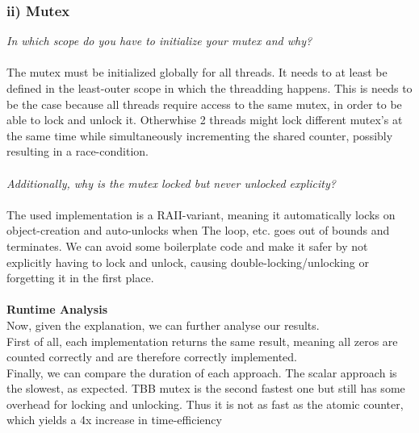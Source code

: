 \documentclass[a4paper]{article}
\begin{document}
\subsubsection*{ii) Mutex}
\textit{In which scope do you have to initialize your mutex and why?}\\\\
The mutex must be initialized globally for all threads. It needs to at least be defined in the least-outer scope in which the threadding happens. This is needs to be the case because all threads require access to the same mutex, in order to be able to lock and unlock it. Otherwhise 2 threads might lock different mutex's at the same time while simultaneously incrementing the shared counter, possibly resulting in a race-condition.\\\\
\textit{Additionally, why is the mutex locked but
never unlocked explicity?}\\\\
The used implementation is a RAII-variant, meaning it automatically locks on object-creation and auto-unlocks when The loop, etc. goes out of bounds and terminates. We can avoid some boilerplate code and make it safer by not explicitly having to lock and unlock, causing double-locking/unlocking or forgetting it in the first place.\\\\
\textbf{Runtime Analysis}\\
Now, given the explanation, we can further analyse our results.\\
First of all, each implementation returns the same result, meaning all zeros are counted correctly and are therefore correctly implemented.\\
Finally, we can compare the duration of each approach. The scalar approach is the slowest, as expected. TBB mutex is the second fastest one but still has some overhead for locking and unlocking. Thus it is not as fast as the atomic counter, which yields a 4x increase in time-efficiency
\end{document}
